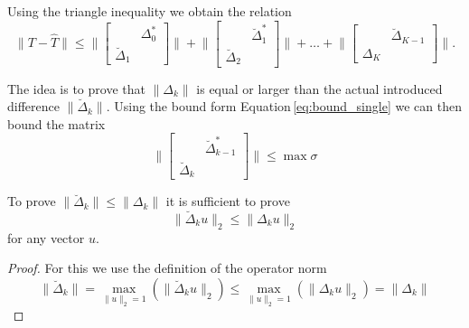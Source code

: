 \documentclass[doctype=mastersthesis,BCOR=15mm,biblatex]{ldvbook}%
\begin{document}
Using the triangle inequality we obtain the relation
\begin{equation}
\|T-\hat{T}\| \leq
\Bigg\|
\begin{bmatrix}
&\Delta_0^*\\
\breve{\Delta}_1
\end{bmatrix}
\Bigg\|+\Bigg\|
\begin{bmatrix}
&\breve{\Delta}_1^*\\
\breve{\Delta}_2
\end{bmatrix}
\Bigg\|+\dots+\Bigg\|
\begin{bmatrix}
&\breve{\Delta}_{K-1}\\
\Delta_K
\end{bmatrix}
\Bigg\|.
\end{equation}

The idea is to prove that $\|\Delta_k\|$ is equal or larger than the actual introduced difference $\|\breve{\Delta}_k\|$.
Using the bound form Equation\,\ref{eq:bound_single} we can then bound the matrix
\begin{equation}
\Bigg\|
\begin{bmatrix}
& \breve{\Delta}_{k-1}^*\\
\breve{\Delta}_k
\end{bmatrix}
\Bigg\| \leq \max{\sigma}
\end{equation}

To prove $\|\breve{\Delta}_k\| \leq \|\Delta_k\|$ it is sufficient to prove
\begin{equation}\label{eq:A_breve_leq_delta}
	\|\breve{\Delta}_k u\|_2 \leq \|\Delta_k u\|_2 
\end{equation}
for any vector $u$.
\begin{proof}
	For this we use the definition of the operator norm
	\begin{equation}
		\|\breve{\Delta}_k\| =
		\underset{\|u\|_2 = 1}{\max}(\|\breve{\Delta}_k u\|_2)
		\leq 
		\underset{\|u\|_2 = 1}{\max}(\|\Delta_k u\|_2)
		=\|\Delta_k\|
	\end{equation}
\end{proof}
\end{document}

